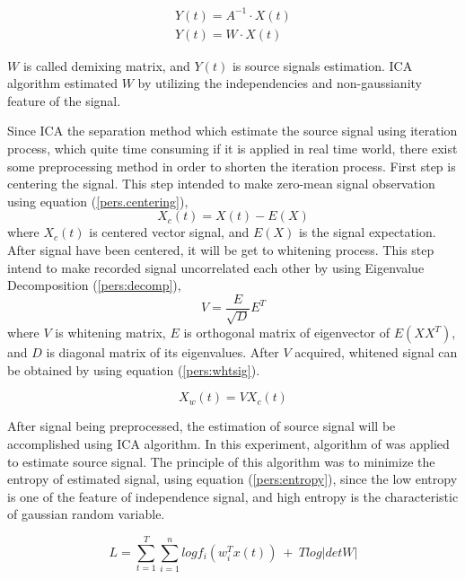 \documentclass[a4paper]{jpconf}
\begin{document}
\begin{equation}\label{pers:estimation}
\begin{aligned}
Y(t)=A^{-1}\cdot X(t)\\
Y(t)=W\cdot X(t)
\end{aligned}
\end{equation}

$W$ is called demixing matrix, and $Y(t)$ is source signals estimation. ICA algorithm estimated $W$ by utilizing the independencies and non-gaussianity feature of the signal.

Since ICA the separation method which estimate the source signal using iteration process, which quite time consuming if it is applied in real time world, there exist some preprocessing method in order to shorten the iteration process. First step is centering the signal. This step intended to make zero-mean signal observation using equation (\ref{pers.centering}),
\begin{equation}\label{pers.centering}
X_c(t) = X(t) - E(X)
\end{equation}
where $X_c(t)$ is centered vector signal, and $E(X)$ is the signal expectation. After signal have been centered, it will be get to whitening process. This step intend to make recorded signal uncorrelated each other by using Eigenvalue Decomposition (\ref{pers:decomp}),
\begin{equation}\label{pers:decomp}
V = \frac{E}{\sqrt{D}}E^T
\end{equation}
where $V$ is whitening matrix, $E$ is orthogonal matrix of eigenvector of $E(XX^T)$, and $D$ is diagonal matrix of its eigenvalues. After $V$ acquired, whitened signal can be obtained by using equation (\ref{pers:whtsig}).

\begin{equation}\label{pers:whtsig}
X_w(t) = V X_c(t)
\end{equation}

After signal being preprocessed, the estimation of source signal will be accomplished using ICA algorithm. In this experiment, algorithm of \cite{5} was applied to estimate source signal. The principle of this algorithm was to minimize the entropy of estimated signal, using equation (\ref{pers:entropy}), since the low entropy is one of the feature of independence signal, and high entropy is the characteristic of gaussian random variable.

\begin{equation}\label{pers:entropy}
L = \sum_{t=1}^T \sum_{i=1}^n log f_i \left(w_i^T x(t)\right) ~+~ T log |det W|
\end{equation}
\end{document}
